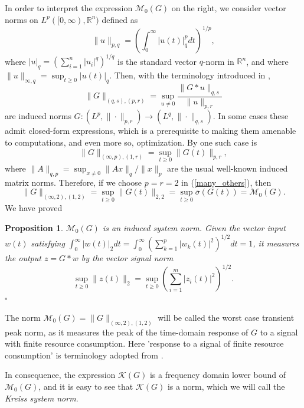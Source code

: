 \documentclass[12pt, a4paper,reqno]{amsart}
\newtheorem{proposition}{\bf Proposition}
\theoremstyle{definition}
\begin{document}
In order to interpret the expression $\mathcal M_0(G)$ on the right, we 
consider vector norms on $L^p([0,\infty),\mathbb R^n)$ defined as
$$
\|u\|_{p,q} = \left(\int_0^\infty |u(t)|_q^p dt\right)^{1/p},
$$
where $|u|_q= \left(\sum_{i=1}^n |u_i|^q\right)^{1/q}$ is the standard vector $q$-norm in $\mathbb R^n$, and where
$\|u\|_{\infty,q} = \sup_{t\geq 0} |u(t)|_q$. Then, with the terminology introduced in \cite{induced_norms},
\begin{equation}
\label{induced_norms}
\|G\|_{(q,s),(p,r)} = 
\sup_{u\not=0} \frac{\|G\ast u\|_{q,s}}{\|u\|_{p,r}}
\end{equation}
are induced norms $G:(L^p,\|\cdot\|_{p,r}) \to (L^q,\|\cdot\|_{q,s})$.
In some  cases these admit closed-form expressions, which is a prerequisite to making them amenable to computations,
and even more so, optimization. By \cite[(25)]{induced_norms} one such case is
\begin{equation}
\label{many_others}
\|G\|_{(\infty,p),(1,r)} = \sup_{t\geq 0} \|G(t)\|_{p,r},
\end{equation}
where $\|A\|_{q,p} = \sup_{x\not=0} \|Ax\|_q/\|x\|_p$ are the usual well-known induced matrix norms.
Therefore, if we choose $p=r=2$ in (\ref{many_others}), then
\begin{equation*}
\|G\|_{(\infty,2),(1,2)} = \sup_{t\geq 0} \|G(t)\|_{2,2} = \sup_{t\geq 0} \overline{\sigma}(G(t)) = \mathcal M_0(G).
\end{equation*}
We have proved

\begin{proposition}
\label{prop1}
$\mathcal M_0(G)$ is an induced system norm. Given the vector input $w(t)$ satisfying 
$\int_0^\infty |w(t)|_2 dt = \int_0^\infty \left( \sum_{k=1}^p |w_k(t)|^2 \right)^{1/2} dt = 1$, it measures the output $z=G \ast w$ by the vector signal norm
$$\sup_{t\geq 0} \|z(t)\|_2
= \sup_{t\geq 0} \left( \sum_{i=1}^m \left| z_i(t) \right|^2\right)^{1/2}.$$
\hfill $\square$
\end{proposition}

The norm $\mathcal M_0(G) = \|G\|_{(\infty,2),(1,2)}$ will be called the worst case transient peak norm, as it
measures the peak of the time-domain response of $G$ to a signal with finite resource consumption.
Here 'response to a signal of finite resource consumption' is terminology adopted from \cite{boyd_barratt}. 



In consequence,
the expression $\mathcal K(G)$ is a frequency domain  lower bound of $\mathcal M_0(G)$, and it is easy to see that $\mathcal K(G)$
is a norm, which we will call the {\em Kreiss system norm}. 
\end{document}
